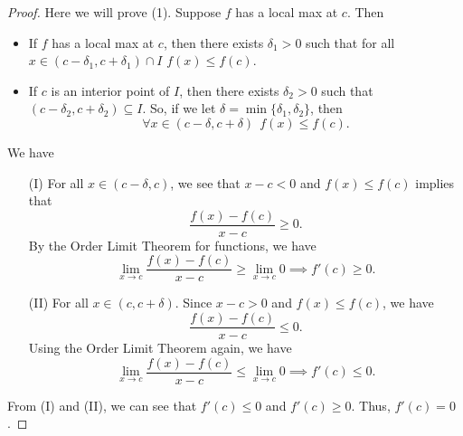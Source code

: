 \begin{proof}
Here we will prove (1). Suppose \( f \) has a local max at \( c  \). Then
\begin{itemize}
    \item If \( f  \) has a local max at \( c  \), then there exists \( {\delta}_{1} > 0  \) such that for all \( x \in (c - {\delta}_{1}, c + {\delta}_{1}) \cap I  \) \( f(x) \leq f(c) \).
    \item If \( c  \) is an interior point of \( I  \), then there exists \( {\delta}_{2} > 0  \) such that \( (c - {\delta}_{2}, c + {\delta}_{2}) \subseteq  I  \). So, if we let \( \delta = \min \{ {\delta}_{1}, {\delta}_{2} \}  \), then
        \[  \forall x \in (c - \delta, c + \delta )  \ \ f(x) \leq f(c). \]
\end{itemize}
We have 
\begin{enumerate}
    \item[(I)] For all \( x \in (c - \delta , c ) \), we see that \( x - c < 0  \) and \( f(x) \leq f(c) \) implies that 
        \[  \frac{ f(x) - f(c) }{ x - c  } \geq 0. \]
        By the Order Limit Theorem for functions, we have 
        \[  \lim_{ x \to c  }  \frac{ f(x) - f(c) }{ x - c  }  \geq \lim_{ x \to c  } 0 \implies f'(c) \geq 0.  \]
    \item[(II)] For all \( x \in (c, c + \delta) \). Since \( x - c > 0  \) and \( f(x) \leq f(c) \), we have 
        \[  \frac{ f(x) - f(c) }{ x - c  }  \leq 0.  \]
        Using the Order Limit Theorem again, we have 
        \[ \lim_{ x \to c  } \frac{ f(x) - f(c) }{  x-  c  }  \leq \lim_{ x \to c  }  0 \implies f'(c) \leq 0.   \]
\end{enumerate}
From (I) and (II), we can see that \( f'(c) \leq 0  \) and \( f'(c) \geq 0  \). Thus, \( f'(c) = 0  \).
\end{proof}

